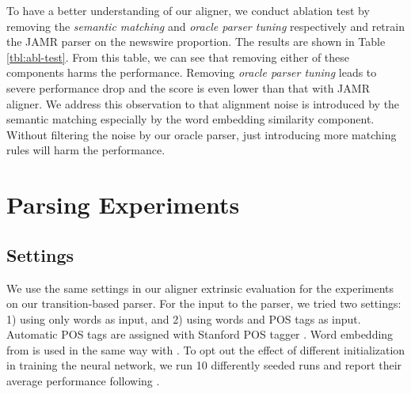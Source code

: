\documentclass[11pt,a4paper]{article}
\begin{document}
To have a better understanding of our aligner, we conduct
ablation test by removing the
{\it semantic matching} and {\it oracle parser tuning} respectively
and retrain the JAMR parser on the newswire proportion.
The results are shown in Table \ref{tbl:abl-test}.
From this table, we can see that removing either of these components
harms the performance. 
Removing {\it oracle parser tuning} leads to severe performance drop
and the score is even lower than that with JAMR aligner.
We address this observation to that alignment noise is introduced by
the semantic matching especially by the word embedding similarity component.
Without filtering the noise by our oracle parser,
just introducing more matching rules will harm the performance.

\section{Parsing Experiments}\label{sec:parse-exp}

\subsection{Settings}
We use the same settings in our aligner extrinsic evaluation
for the experiments on our transition-based parser.
For the input to the parser, we tried two settings: 1) using only words as input,
and 2) using words and POS tags as input.
Automatic POS tags are assigned with Stanford POS tagger \cite{manning-EtAl:2014:P14-5}.
Word embedding from \citet{ling-EtAl:2015:NAACL-HLT} is used
in the same way with \citet{ballesteros-alonaizan:2017:EMNLP2017}.
To opt out the effect of different initialization in training the neural network,
we run 10 differently seeded runs and report their average performance following \citet{reimers-gurevych:2017:EMNLP2017}.
\end{document}
